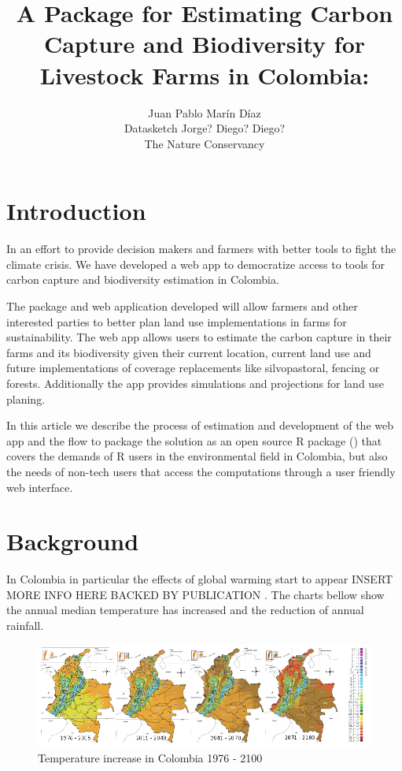 \documentclass[
]{jss}
\author{
Juan Pablo Marín Díaz\\Datasketch \And Jorge? Diego? Diego?\\The Nature Conservancy
}
\title{A Package for Estimating Carbon Capture and Biodiversity for Livestock
Farms in Colombia: \pkg{GanaderiaSostenible}}
\begin{document}
\hypertarget{introduction}{%
\section{Introduction}\label{introduction}}

In an effort to provide decision makers and farmers with better tools to
fight the climate crisis. We have developed a web app to democratize
access to tools for carbon capture and biodiversity estimation in
Colombia.

The package and web application developed will allow farmers and other
interested parties to better plan land use implementations in farms for
sustainability. The web app allows users to estimate the carbon capture
in their farms and its biodiversity given their current location,
current land use and future implementations of coverage replacements
like silvopastoral, fencing or forests. Additionally the app provides
simulations and projections for land use planing.

In this article we describe the process of estimation and development of
the web app and the flow to package the solution as an open source R
package (\citet{RCoreTeam}) that covers the demands of R users in the
environmental field in Colombia, but also the needs of non-tech users
that access the computations through a user friendly web interface.

\hypertarget{background}{%
\section{Background}\label{background}}

In Colombia in particular the effects of global warming start to appear
INSERT MORE INFO HERE BACKED BY PUBLICATION \citet{Pending}. The charts
bellow show the annual median temperature has increased and the
reduction of annual rainfall.

\begin{figure}
\centering
\includegraphics{figures/temperature.png}
\caption{Temperature increase in Colombia 1976 - 2100}
\end{figure}
\end{document}

